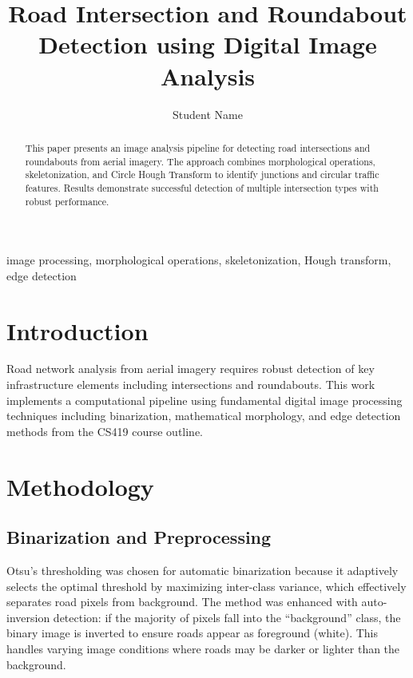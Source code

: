 \documentclass[conference]{IEEEtran}
\begin{document}
\title{Road Intersection and Roundabout Detection using Digital Image Analysis}

\author{Student Name}

\maketitle

\begin{abstract}
This paper presents an image analysis pipeline for detecting road intersections and roundabouts from aerial imagery. The approach combines morphological operations, skeletonization, and Circle Hough Transform to identify junctions and circular traffic features. Results demonstrate successful detection of multiple intersection types with robust performance.
\end{abstract}

\begin{IEEEkeywords}
image processing, morphological operations, skeletonization, Hough transform, edge detection
\end{IEEEkeywords}

\section{Introduction}

Road network analysis from aerial imagery requires robust detection of key infrastructure elements including intersections and roundabouts. This work implements a computational pipeline using fundamental digital image processing techniques including binarization, mathematical morphology, and edge detection methods from the CS419 course outline.

\section{Methodology}

\subsection{Binarization and Preprocessing}

Otsu's thresholding was chosen for automatic binarization because it adaptively selects the optimal threshold by maximizing inter-class variance, which effectively separates road pixels from background. The method was enhanced with auto-inversion detection: if the majority of pixels fall into the ``background'' class, the binary image is inverted to ensure roads appear as foreground (white). This handles varying image conditions where roads may be darker or lighter than the background.
\end{document}
